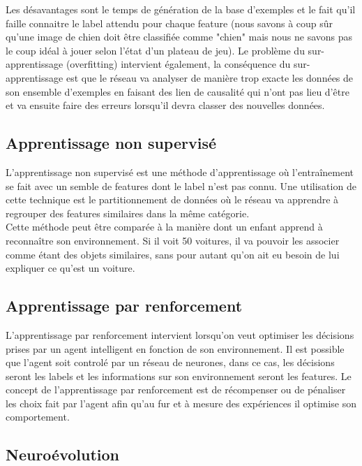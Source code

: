 \documentclass{article}
\begin{document}
Les désavantages sont le temps de génération de la base d'exemples et le fait qu'il faille connaitre le label attendu pour chaque feature (nous savons à coup sûr qu'une image de chien doit être classifiée comme "chien" mais nous ne savons pas le coup idéal à jouer selon l'état d'un plateau de jeu). Le problème du sur-apprentissage (overfitting) intervient également, la conséquence du sur-apprentissage est que le réseau va analyser de manière trop exacte les données de son ensemble d'exemples en faisant des lien de causalité qui n'ont pas lieu d'être et va ensuite faire des erreurs lorsqu'il devra classer des nouvelles données.

\subsection{Apprentissage non supervisé}

L'apprentissage non supervisé est une méthode d'apprentissage où l'entraînement se fait avec un semble de features dont le label n'est pas connu. Une utilisation de cette technique est le partitionnement de données où le réseau va apprendre à regrouper des features similaires dans la même catégorie\cite{wikiunsupervised}.\\

Cette méthode peut être comparée à la manière dont un enfant apprend à reconnaître son environnement. Si il voit 50 voitures, il va pouvoir les associer comme étant des objets similaires, sans pour autant qu'on ait eu besoin de lui expliquer ce qu'est un voiture.

\subsection{Apprentissage par renforcement}

L'apprentissage par renforcement intervient lorsqu'on veut optimiser les décisions prises par un agent intelligent en fonction de son environnement. Il est possible que l'agent soit controlé par un réseau de neurones, dans ce cas, les décisions seront les labels et les informations sur son environnement seront les features. Le concept de l'apprentissage par renforcement est de récompenser ou de pénaliser les choix fait par l'agent afin qu'au fur et à mesure des expériences il optimise son comportement\cite{wikirl}.

\subsection{Neuroévolution}
\end{document}
